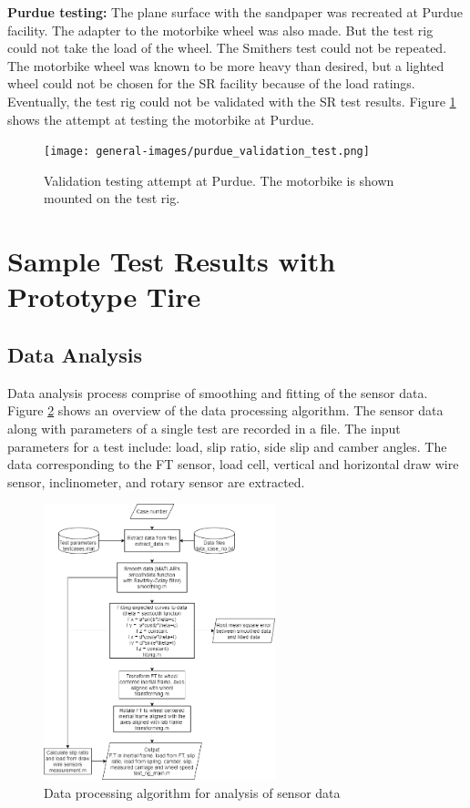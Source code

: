 \documentclass{article}
\begin{document}
\textbf{Purdue testing:} The plane surface with the sandpaper was recreated at Purdue facility. The adapter to the motorbike wheel was also made. But the test rig could not take the load of the wheel. The Smithers  test could not be repeated. The motorbike wheel was known to be more heavy than desired, but a lighted wheel could not be chosen for the SR facility because of the load ratings. Eventually, the test rig could not be validated with the SR test results. Figure \ref{fig:purdue-validation-test} shows the attempt at testing the motorbike at Purdue.

\begin{figure}[hbt!]
\centering
\texttt{[image: general-images/purdue\_validation\_test.png]}
\caption{Validation testing attempt at Purdue. The motorbike is shown mounted on the test rig.}
\label{fig:purdue-validation-test}
\end{figure}

\section{Sample Test Results with Prototype Tire}

\subsection{Data Analysis}
Data analysis process comprise of smoothing and fitting of the sensor data. Figure \ref{fig:data-processing-algorithm} shows an overview of the data processing algorithm. The sensor data along with parameters of a single test are recorded in a file. The input parameters for a test include: load, slip ratio, side slip and camber angles. The data corresponding to the FT sensor, load cell, vertical and horizontal draw wire sensor, inclinometer, and rotary sensor are extracted. 

\begin{figure}[hbt!]
\centering
\includegraphics[width=0.6\textwidth]{general-images/test_rig_data_analysis.png}
\caption{Data processing algorithm for analysis of sensor data}
\label{fig:data-processing-algorithm}
\end{figure}
\end{document}
